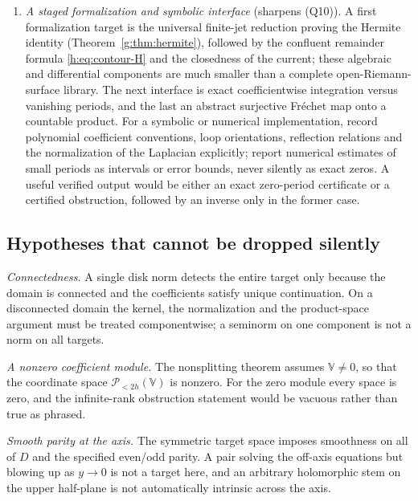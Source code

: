 \documentclass[11pt,a4paper]{article}
\numberwithin{equation}{section}
\theoremstyle{definition}
\theoremstyle{remark}
\theoremstyle{plain}
\newcommand{\VV}{\mathbb V}                       %
\newcommand{\PolH}{\mathscr P_{<2h}(\VV)}
\begin{document}
\begin{enumerate}[label=\textup{(R\arabic*)}]
the correct radial normalization and angular multiplicities, and decide whether
modewise admissible periods assemble into one obstruction space for a
convergent nonaxial expansion. Independent formal inverses in each angular mode
are not sufficient: convergence, compatibility at the axis, and a common
analytic norm in which the reconstruction is defined are needed, and these
issues are distinct from the coefficientwise Cousin argument used here.
\item \emph{A staged formalization and symbolic interface} (sharpens (Q10)). A
first formalization target is the universal finite-jet reduction proving the
Hermite identity (Theorem~\ref{g:thm:hermite}), followed by the confluent
remainder formula \eqref{h:eq:contour-H} and the closedness of the current;
these algebraic and differential components are much smaller than a complete
open-Riemann-surface library. The next interface is exact coefficientwise
integration versus vanishing periods, and the last an abstract surjective
Fr\'echet map onto a countable product. For a symbolic or numerical
implementation, record polynomial coefficient conventions, loop orientations,
reflection relations and the normalization of the Laplacian explicitly; report
numerical estimates of small periods as intervals or error bounds, never
silently as exact zeros. A useful verified output would be either an exact
zero-period certificate or a certified obstruction, followed by an inverse only
in the former case.
\end{enumerate}

\subsection{Hypotheses that cannot be dropped silently}
\label{h:app:audit}

\emph{Connectedness.} A single disk norm detects the entire target only because
the domain is connected and the coefficients satisfy unique continuation. On a
disconnected domain the kernel, the normalization and the product-space
argument must be treated componentwise; a seminorm on one component is not a
norm on all targets.

\emph{A nonzero coefficient module.} The nonsplitting theorem assumes
$\VV\ne0$, so that the coordinate space $\PolH$ is nonzero. For the zero module
every space is zero, and the infinite-rank obstruction statement would be
vacuous rather than true as phrased.

\emph{Smooth parity at the axis.} The symmetric target space imposes smoothness
on all of $D$ and the specified even/odd parity. A pair solving the off-axis
equations but blowing up as $y\to0$ is not a target here, and an arbitrary
holomorphic stem on the upper half-plane is not automatically intrinsic across
the axis.
\end{document}
